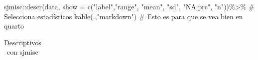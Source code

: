 \documentclass[
  letterpaper,
  DIV=11,
  numbers=noendperiod]{scrartcl}
\newenvironment{Shaded}{\begin{snugshade}}{\end{snugshade}}
\newcommand{\AttributeTok}[1]{\textcolor[rgb]{0.40,0.45,0.13}{#1}}
\newcommand{\CommentTok}[1]{\textcolor[rgb]{0.37,0.37,0.37}{#1}}
\newcommand{\FunctionTok}[1]{\textcolor[rgb]{0.28,0.35,0.67}{#1}}
\newcommand{\NormalTok}[1]{\textcolor[rgb]{0.00,0.23,0.31}{#1}}
\newcommand{\SpecialCharTok}[1]{\textcolor[rgb]{0.37,0.37,0.37}{#1}}
\newcommand{\StringTok}[1]{\textcolor[rgb]{0.13,0.47,0.30}{#1}}
\begin{document}
\begin{Shaded}
\begin{Highlighting}[]
\NormalTok{sjmisc}\SpecialCharTok{::}\FunctionTok{descr}\NormalTok{(data,}
      \AttributeTok{show =} \FunctionTok{c}\NormalTok{(}\StringTok{"label"}\NormalTok{,}\StringTok{"range"}\NormalTok{, }\StringTok{"mean"}\NormalTok{, }\StringTok{"sd"}\NormalTok{, }\StringTok{"NA.prc"}\NormalTok{, }\StringTok{"n"}\NormalTok{))}\SpecialCharTok{\%\textgreater{}\%} \CommentTok{\# Selecciona estadísticos}
      \FunctionTok{kable}\NormalTok{(.,}\StringTok{"markdown"}\NormalTok{) }\CommentTok{\# Esto es para que se vea bien en quarto}
\end{Highlighting}
\end{Shaded}

\begin{longtable}[]{@{}
  >{\raggedright\arraybackslash}p{}
  >{\raggedright\arraybackslash}p{}
  >{\raggedright\arraybackslash}p{}
  >{\raggedleft\arraybackslash}p{}
  >{\raggedleft\arraybackslash}p{}
  >{\raggedleft\arraybackslash}p{}
  >{\raggedleft\arraybackslash}p{}
  >{\raggedright\arraybackslash}p{}@{}}

\caption{\label{tbl-sjmisc}Descriptivos con sjmisc}

\tabularnewline


\end{longtable}
\end{document}
